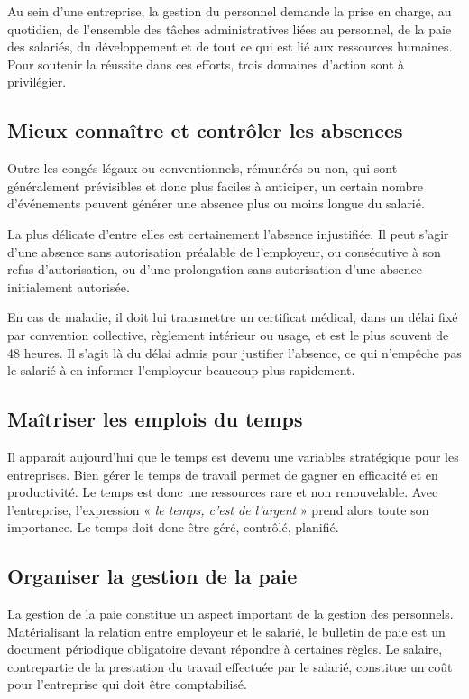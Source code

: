 Au sein d'une entreprise, la gestion du personnel demande la prise en charge, au quotidien, de l'ensemble des tâches administratives liées au personnel, de la paie des salariés, du développement et de tout ce qui est lié aux ressources humaines. Pour soutenir la réussite dans ces efforts, trois domaines d'action sont à privilégier.

\subsection{Mieux connaître et contrôler les absences}
Outre les congés légaux ou conventionnels, rémunérés ou non, qui sont généralement prévisibles et donc plus faciles à anticiper, un certain nombre d'événements peuvent générer une absence plus ou moins longue du salarié.
\medskip

La plus délicate d'entre elles est certainement l'absence injustifiée. Il peut s'agir d'une absence sans autorisation préalable de l'employeur, ou consécutive à son refus d'autorisation, ou d'une prolongation sans autorisation d'une absence initialement autorisée.
\medskip

En cas de maladie, il doit lui transmettre un certificat médical, dans un délai fixé par convention collective, règlement intérieur ou usage, et est le plus souvent de 48 heures. Il s'agit là du délai admis pour justifier l'absence, ce qui n'empêche pas le salarié à en informer l'employeur beaucoup plus rapidement.

\subsection{Maîtriser les emplois du temps}
Il apparaît aujourd'hui que le temps est devenu une variables stratégique pour les entreprises. Bien gérer le temps de travail permet de gagner en efficacité et en productivité. Le temps est donc une ressources rare et non renouvelable. Avec l'entreprise, l'expression « \textit{le temps, c'est de l'argent} » prend alors toute son importance. Le temps doit donc être géré, contrôlé, planifié. 

\subsection{Organiser la gestion de la paie}
La gestion de la paie constitue un aspect important de la gestion des personnels. Matérialisant la relation entre employeur et le salarié, le bulletin de paie est un document périodique obligatoire devant répondre à certaines règles. Le salaire, contrepartie de la prestation du travail effectuée par le salarié, constitue un coût pour l'entreprise qui doit être comptabilisé. 
\medskip

